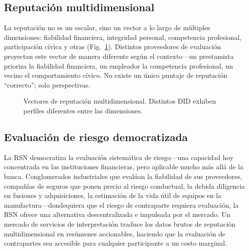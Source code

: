 \documentclass[11pt,a4paper,twocolumn]{article}
\begin{document}
\subsection{Reputación multidimensional}

La reputación no es un escalar, sino un vector a lo largo de múltiples dimensiones: fiabilidad financiera, integridad personal, competencia profesional, participación cívica y otras (Fig.~\ref{fig:reputation-radar}). Distintos proveedores de evaluación proyectan este vector de manera diferente según el contexto---un prestamista prioriza la fiabilidad financiera, un empleador la competencia profesional, un vecino el comportamiento cívico. No existe un único puntaje de reputación ``correcto''; solo perspectivas.

\begin{figure}[ht]
\centering
{}
\caption{Vectores de reputación multidimensional. Distintos DID exhiben perfiles diferentes entre las dimensiones.}
\label{fig:reputation-radar}
\end{figure}

\subsection{Evaluación de riesgo democratizada}

La RSN democratiza la evaluación sistemática de riesgo---una capacidad hoy concentrada en las instituciones financieras, pero aplicable mucho más allá de la banca. Conglomerados industriales que evalúan la fiabilidad de sus proveedores, compañías de seguros que ponen precio al riesgo conductual, la debida diligencia en fusiones y adquisiciones, la estimación de la vida útil de equipos en la manufactura---dondequiera que el riesgo de contraparte requiera evaluación, la RSN ofrece una alternativa descentralizada e impulsada por el mercado. Un mercado de servicios de interpretación traduce los datos brutos de reputación multidimensional en resúmenes accionables, haciendo que la evaluación de contrapartes sea accesible para cualquier participante a un costo marginal.
\end{document}
